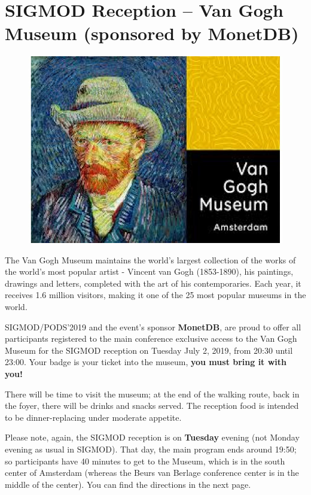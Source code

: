 
\section{SIGMOD Reception -- Van Gogh Museum (sponsored by MonetDB)}

\vspace{-2mm}

\begin{figure}[h]
\centering
\includegraphics[width=.6\textwidth]{images/reception/vangogh.jpeg}
\end{figure}


The Van Gogh Museum maintains the world's largest collection of the works of the world's most popular artist - Vincent van Gogh (1853-1890), his paintings, drawings and letters, completed with the art of his contemporaries. Each year, it receives 1.6 million visitors, making it one of the 25 most popular museums in the world.

SIGMOD/PODS'2019 and the event's sponsor \textbf{MonetDB}, are proud to offer all participants registered to the main conference exclusive access to the Van Gogh Museum for the SIGMOD reception on Tuesday July 2, 2019, from 20:30 until 23:00.
Your badge is your ticket into the museum, \textbf{you must bring it with you!}


There will be time to visit the museum; at the end of the walking route, back in the foyer, there will be drinks and snacks served. The reception food is intended to be dinner-replacing under moderate appetite.

Please note, again, the SIGMOD reception is on \textbf{Tuesday} evening (not Monday evening as usual in SIGMOD). That day, the main program ends around 19:50; so participants have 40 minutes to get to the Museum, which is in the south center of Amsterdam (whereas the Beurs van Berlage conference center is in the middle of the center). You can find the directions in the next page.


